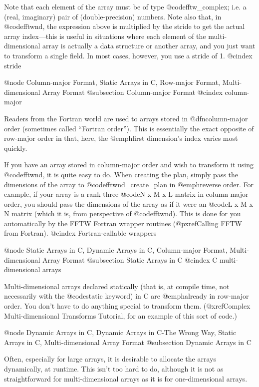 Note that each element of the array must be of type @code{fftw_complex};
i.e. a (real, imaginary) pair of (double-precision) numbers. Note also
that, in @code{fftwnd}, the expression above is multiplied by the stride
to get the actual array index---this is useful in situations where each
element of the multi-dimensional array is actually a data structure or
another array, and you just want to transform a single field. In most
cases, however, you use a stride of 1.
@cindex stride

@node Column-major Format, Static Arrays in C, Row-major Format, Multi-dimensional Array Format
@subsection Column-major Format
@cindex column-major

Readers from the Fortran world are used to arrays stored in
@dfn{column-major} order (sometimes called ``Fortran order'').  This is
essentially the exact opposite of row-major order in that, here, the
@emph{first} dimension's index varies most quickly.

If you have an array stored in column-major order and wish to transform
it using @code{fftwnd}, it is quite easy to do.  When creating the plan,
simply pass the dimensions of the array to @code{fftwnd_create_plan} in
@emph{reverse order}.  For example, if your array is a rank three
@code{N x M x L} matrix in column-major order, you should pass the
dimensions of the array as if it were an @code{L x M x N} matrix (which
it is, from perspective of @code{fftwnd}).  This is done for you
automatically by the FFTW Fortran wrapper routines (@pxref{Calling FFTW
from Fortran}).
@cindex Fortran-callable wrappers

@node Static Arrays in C, Dynamic Arrays in C, Column-major Format, Multi-dimensional Array Format
@subsection Static Arrays in C
@cindex C multi-dimensional arrays

Multi-dimensional arrays declared statically (that is, at compile time,
not necessarily with the @code{static} keyword) in C are @emph{already}
in row-major order.  You don't have to do anything special to transform
them.  (@xref{Complex Multi-dimensional Transforms Tutorial}, for an
example of this sort of code.)

@node Dynamic Arrays in C, Dynamic Arrays in C-The Wrong Way, Static Arrays in C, Multi-dimensional Array Format
@subsection Dynamic Arrays in C

Often, especially for large arrays, it is desirable to allocate the
arrays dynamically, at runtime.  This isn't too hard to do, although it
is not as straightforward for multi-dimensional arrays as it is for
one-dimensional arrays.

